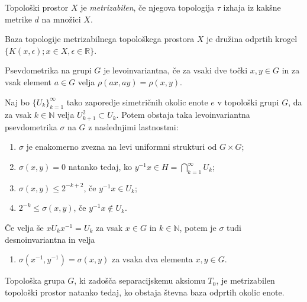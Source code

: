 \documentclass[mat1]{fmfdelo}
\newcommand{\R}{\mathbb R}
\newcommand{\N}{\mathbb N}
\begin{document}
\begin{definicija}\label{def:metrizabilnost}
	Topološki prostor $X$ je \emph{metrizabilen}, če njegova topologija $\tau$ izhaja iz kakšne metrike $d$ na množici $X$.
\end{definicija}

\begin{opomba}
	Baza topologije metrizabilnega topološkega prostora $X$ je družina odprtih krogel $\lbrace K(x, \epsilon); x \in X, \epsilon \in \R \rbrace$.
\end{opomba}


\begin{definicija}
Psevdometrika na grupi $G$ je levoinvariantna, če za vsaki dve točki $x, y \in G$ in za vsak element $a \in G$ velja $\rho(ax, ay) = \rho(x, y)$.
\end{definicija}

\begin{izrek}\label{izr:pseudometrika}
	Naj bo $\lbrace U_k \rbrace_{k = 1}^{\infty}$ tako zaporedje simetričnih okolic enote $e$ v topološki grupi $G$, da za vsak $k \in \N$ velja $U_{k+1}^2 \subset U_k$. Potem obstaja taka levoinvariantna psevdometrika $\sigma$ na $G$ z naslednjimi lastnostmi:
	\begin{enumerate}
		\item $\sigma$ je enakomerno zvezna na levi uniformni strukturi od $G \times G$;
		\item $\sigma (x, y) = 0$ natanko tedaj, ko $y^{-1}x \in H = \bigcap_{k=1}^{\infty} U_k$;
		\item $\sigma (x, y) \leq 2^{-k+2}$, če $y^{-1}x \in U_k$;
		\item $2^{-k} \leq \sigma (x, y)$, če $y^{-1}x \notin U_k$.
	\end{enumerate}
	
	Če velja še $x U_k x^{-1} = U_k$ za vsak $x \in G$ in $k \in \N$, potem je $\sigma$ tudi desnoinvariantna in velja
	\begin{enumerate}[resume]
		\item $\sigma (x^{-1}, y^{-1}) = \sigma (x, y)$ za vsaka dva elementa $x, y \in G$.
	\end{enumerate}
\end{izrek}

\begin{izrek}\label{izr:metrizabilnost}
	Topološka grupa $G$, ki zadošča separacijskemu aksiomu $T_0$, je metrizabilen topološki prostor natanko tedaj, ko obstaja števna baza odprtih okolic enote.
\end{izrek}
\end{document}
